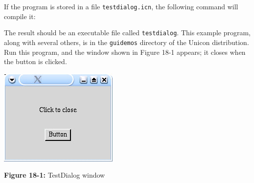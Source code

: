 

\noindent If the program is stored in a file
\texttt{testdialog.icn},
the following command will compile it:


\noindent The result should be an executable file called
\texttt{testdialog}.  This example program, along with several
others, is in the \texttt{guidemos} directory of the Unicon
distribution. Run this program, and the window shown in Figure 18-1
appears; it closes when the button is clicked.

\begin{center}
\includegraphics[width=2.3126in,height=1.8752in]{ub-img/ub-img50.jpg}
\end{center}

{\sffamily\bfseries Figure 18-1:}
{\sffamily TestDialog window}


